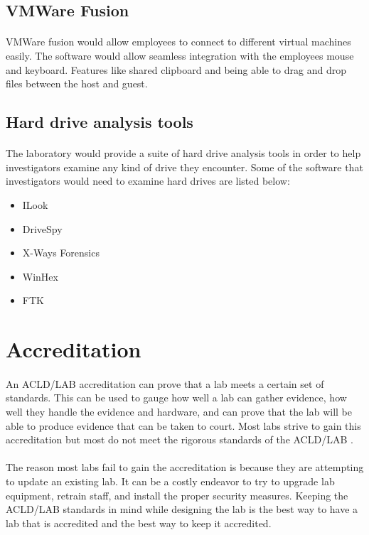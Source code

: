 \documentclass[12pt]{article}
\begin{document}
\subsection{VMWare Fusion} 
\paragraph{}
VMWare fusion would allow employees to connect to different virtual machines easily.
The software would allow seamless integration with the employees mouse and keyboard. 
Features like shared clipboard and being able to drag and drop files between the host and guest.
\subsection{Hard drive analysis tools}
\paragraph{}
The laboratory would provide a suite of hard drive analysis tools in order to help investigators examine any kind of drive they encounter. Some of the software that investigators would need to examine hard drives are listed below:\cite[p.~132]{hayes}
\begin{itemize}
\item ILook
\item DriveSpy
\item X-Ways Forensics
\item WinHex
\item FTK
\end{itemize}

\section{Accreditation}
\paragraph{} 
An ACLD/LAB accreditation can prove that a lab meets a certain set of standards.
This can be used to gauge how well a lab can gather evidence, how well they handle the evidence and hardware, and can prove that the lab will be able to produce evidence that can be taken to court.
Most labs strive to gain this accreditation but most do not meet the rigorous standards of the ACLD/LAB \cite{hayes}.
\paragraph{}
The reason most labs fail to gain the accreditation is because they are attempting to update an existing lab.
It can be a costly endeavor to try to upgrade lab equipment, retrain staff, and install the proper security measures.
Keeping the ACLD/LAB standards in mind while designing the lab is the best way to have a lab that is accredited and the best way to keep it accredited.
\end{document}
